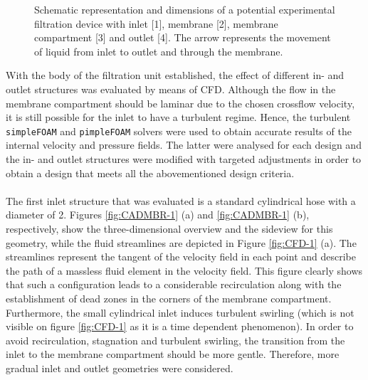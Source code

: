 \begin{figure}[H]
    \centering
    \def\svgwidth{\columnwidth}
    
 \caption{Schematic representation and dimensions of a potential experimental filtration device with inlet [1], membrane [2], membrane compartment [3] and outlet [4]. The arrow represents the movement of liquid from inlet to outlet and through the membrane. \label{fig:schemMBR}}
 \label{fig:schemMBR}
\end{figure}
With the body of the filtration unit established, the effect of different in- and outlet structures was evaluated by means of \gls{CFD}. Although the flow in the membrane compartment should be laminar due to the chosen crossflow velocity, it is still possible for the inlet to have a turbulent regime. Hence, the turbulent \texttt{simpleFOAM} and \texttt{pimpleFOAM} solvers were used to obtain accurate results of the internal velocity and pressure fields. The latter were analysed for each design and the in- and outlet structures were modified with targeted adjustments in order to obtain a design that meets all the abovementioned design criteria. \\ \\
The first inlet structure that was evaluated is a standard cylindrical hose with a diameter of \unit{2}{\centi\metre}. Figures \ref{fig:CADMBR-1} (a) and \ref{fig:CADMBR-1} (b), respectively, show the three-dimensional overview and the sideview for this geometry, while the fluid streamlines are depicted in Figure \ref{fig:CFD-1} (a). The streamlines represent the tangent of the velocity field in each point and describe the path of a massless fluid element in the velocity field.
This figure clearly shows that such a configuration leads to a considerable recirculation along with the establishment of dead zones in the corners of the membrane compartment. Furthermore, the small cylindrical inlet induces turbulent swirling (which is not visible on figure \ref{fig:CFD-1} as it is a time dependent phenomenon). In order to avoid recirculation, stagnation and turbulent swirling, the transition from the inlet to the membrane compartment should be more gentle. Therefore, more gradual inlet and outlet geometries were considered. \par 
